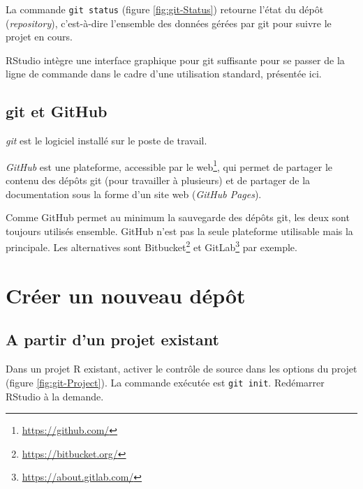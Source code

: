 \documentclass[
  12pt,
  french,
  a4paper,
  extrafontsizes,onecolumn,openright
  ]{memoir}
\newlength{\rf}
\begin{document}
\normalsize

La commande \texttt{git\ status} (figure \ref{fig:git-Status}) retourne l'état du dépôt (\emph{repository}), c'est-à-dire l'ensemble des données gérées par git pour suivre le projet en cours.

RStudio intègre une interface graphique pour git suffisante pour se passer de la ligne de commande dans le cadre d'une utilisation standard, présentée ici.

\hypertarget{git-et-github-1}{%
\subsection{git et GitHub}\label{git-et-github-1}}

\emph{git} est le logiciel installé sur le poste de travail.

\emph{GitHub} est une plateforme, accessible par le web\footnote{\url{https://github.com/}}, qui permet de partager le contenu des dépôts git (pour travailler à plusieurs) et de partager de la documentation sous la forme d'un site web (\emph{GitHub Pages}).

Comme GitHub permet au minimum la sauvegarde des dépôts git, les deux sont toujours utilisés ensemble.
GitHub n'est pas la seule plateforme utilisable mais la principale. Les alternatives sont Bitbucket\footnote{\url{https://bitbucket.org/}} et GitLab\footnote{\url{https://about.gitlab.com/}} par exemple.

\hypertarget{sec:creerdepot}{%
\section{Créer un nouveau dépôt}\label{sec:creerdepot}}

\hypertarget{a-partir-dun-projet-existant}{%
\subsection{A partir d'un projet existant}\label{a-partir-dun-projet-existant}}

Dans un projet R existant, activer le contrôle de source dans les options du projet (figure \ref{fig:git-Project}).
La commande exécutée est \texttt{git\ init}.
Redémarrer RStudio à la demande.



\scriptsize
\end{document}
